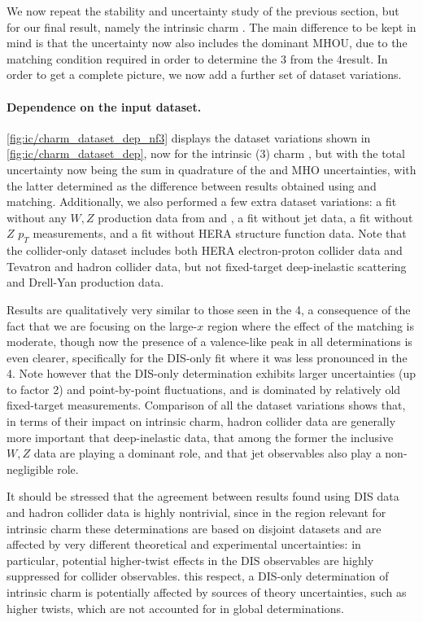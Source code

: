 
We now repeat the stability and uncertainty
study of the previous section, but for our final
result, namely the intrinsic charm \pdf. The main difference to be kept
in mind is that the uncertainty now also includes the dominant MHOU,
due to the matching condition required in order to determine the 3\fns
\pdf from the 4\fns result. In order to get a complete picture, we now
add a further set of dataset variations.

\paragraph{Dependence on the input dataset.}
%
\cref{fig:ic/charm_dataset_dep_nf3} displays the dataset variations shown in
\cref{fig:ic/charm_dataset_dep}, now for the intrinsic (3\fns) charm
\pdf, but with the total uncertainty now being the sum in quadrature of
the \pdf and MHO uncertainties, with the latter determined as the difference between
results obtained using \nnlo and \nnnlo matching.
%
Additionally, we also performed a few extra  dataset
variations: a fit without any $W, Z$ production data from \atlas and \cms,
a fit without jet data, a fit without $Z$ $p_T$ measurements, and a fit without
HERA structure function data.
%
Note that the collider-only dataset includes both HERA electron-proton
collider data and Tevatron and \lhc hadron collider data, but not
fixed-target deep-inelastic scattering and Drell-Yan production data.


Results are qualitatively very similar to those seen in the 4\fns, a
consequence of the fact that we are focusing on the large-$x$ region where the
effect of the matching is moderate, though now the presence of a
valence-like peak in all determinations is even clearer, specifically
for the DIS-only fit where it was less pronounced in the 4\fns.
%
 Note however that the DIS-only determination
  exhibits larger uncertainties
  (up to factor 2) and point-by-point fluctuations,
  and is dominated by relatively old fixed-target measurements.
%
Comparison of all the dataset variations shows that, in terms of their
impact on intrinsic charm,
hadron collider data are generally more important
that deep-inelastic data, that among the former the
\lhcb inclusive $W,Z$ data are playing a dominant role,
and that jet observables also play a non-negligible role.

It should be stressed that the agreement between results found using
DIS data and hadron collider data is highly nontrivial, since in the region
relevant for intrinsic charm these determinations are based on disjoint datasets
and are  affected by
very different theoretical and experimental uncertainties:
in particular, potential higher-twist
effects in the DIS observables are highly suppressed for collider observables.
%
 this respect, a DIS-only determination of intrinsic charm
  is potentially affected by sources of theory uncertainties, such as higher twists,
which are not accounted for in global \pdf determinations.

